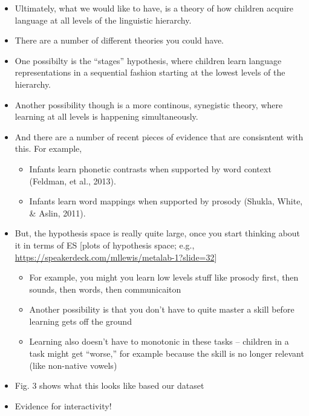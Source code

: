 \documentclass[english,floatsintext,man]{apa6}
\providecommand{\tightlist}{%
  \setlength{\itemsep}{0pt}\setlength{\parskip}{0pt}}
\begin{document}
\begin{itemize}
\item
  Ultimately, what we would like to have, is a theory of how children
  acquire language at all levels of the linguistic hierarchy.
\item
  There are a number of different theories you could have.
\item
  One possibilty is the \enquote{stages} hypothesis, where children
  learn language representations in a sequential fashion starting at the
  lowest levels of the hierarchy.
\item
  Another possibility though is a more continous, synegistic theory,
  where learning at all levels is happening simultaneously.
\item
  And there are a number of recent pieces of evidence that are
  consisntent with this. For example,

  \begin{itemize}
  \tightlist
  \item
    Infants learn phonetic contrasts when supported by word context
    (Feldman, et al., 2013).
  \item
    Infants learn word mappings when supported by prosody (Shukla,
    White, \& Aslin, 2011).
  \end{itemize}
\item
  But, the hypothesis space is really quite large, once you start
  thinking about it in terms of ES {[}plots of hypothesis space; e.g.,
  \url{https://speakerdeck.com/mllewis/metalab-1?slide=32}{]}

  \begin{itemize}
  \tightlist
  \item
    For example, you might you learn low levels stuff like prosody
    first, then sounds, then words, then communicaiton
  \item
    Another possibility is that you don't have to quite master a skill
    before learning gets off the ground
  \item
    Learning also doesn't have to monotonic in these tasks -- children
    in a task might get \enquote{worse,} for example because the skill
    is no longer relevant (like non-native vowels)
  \end{itemize}
\item
  Fig. 3 shows what this looks like based our dataset
\item
  Evidence for interactivity!
\end{itemize}

\doublespacing
\end{document}
